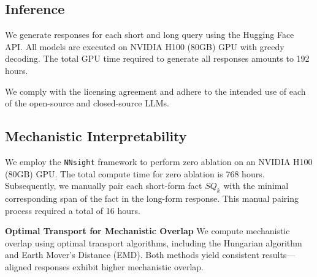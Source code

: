 \documentclass[11pt]{article}
\newcommand{\rparagraph}[1]{\vspace{1.2mm}\noindent\textbf{#1}}
\begin{document}
\subsection{Inference}
We generate responses for each short and long query using the Hugging Face API. All models are executed on NVIDIA H100 (80GB) GPU with greedy decoding. The total GPU time required to generate all responses amounts to 192 hours.

We comply with the licensing agreement and adhere to the intended use of each of the open-source and closed-source LLMs. 

\subsection{Mechanistic Interpretability}
We employ the \texttt{NNsight} framework to perform zero ablation on an NVIDIA H100 (80GB) GPU. The total compute time for zero ablation is 768 hours. Subsequently, we manually pair each short-form fact $SQ_k$ with the minimal corresponding span of the fact in the long-form response. This manual pairing process required a total of 16 hours.

\rparagraph{Optimal Transport for Mechanistic Overlap}
We compute mechanistic overlap using optimal transport algorithms, including the Hungarian algorithm and Earth Mover’s Distance (EMD). Both methods yield consistent results—aligned responses exhibit higher mechanistic overlap. 
\end{document}
